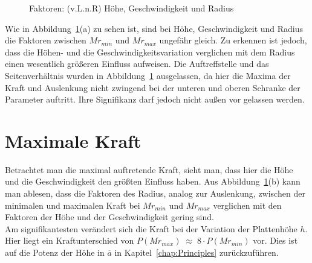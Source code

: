 \begin{figure}[H]%
	\centering
	\qquad
	\caption{Faktoren: (v.L.n.R) Höhe, Geschwindigkeit und Radius}%
	\label{fig:Faktoren}%
\end{figure}

Wie in Abbildung~\ref{fig:Faktoren}(a) zu sehen ist, sind bei Höhe, Geschwindigkeit und Radius die Faktoren zwischen $Mr_{min}$ und $Mr_{max}$ ungefähr gleich. Zu erkennen ist jedoch, dass die Höhen- und die Geschwindigkeitsvariation verglichen mit dem Radius einen wesentlich größeren Einfluss aufweisen.
Die Auftreffstelle und das Seitenverhältnis wurden in Abbildung~\ref{fig:Faktoren} ausgelassen, da hier die Maxima der Kraft und Auslenkung nicht zwingend bei der unteren und oberen Schranke der Parameter auftritt. Ihre Signifikanz darf jedoch nicht außen vor gelassen werden.\\


\section{Maximale Kraft}
\label{sec:Kraft}

Betrachtet man die maximal auftretende Kraft, sieht man, dass hier die Höhe und die Geschwindigkeit den größten Einfluss haben. Aus Abbildung~\ref{fig:Faktoren}(b) kann man ablesen, dass die Faktoren des Radius, analog zur Auslenkung, zwischen der minimalen und maximalen Kraft bei $Mr_{min}$ und $Mr_{max}$ verglichen mit den Faktoren der Höhe und der Geschwindigkeit gering sind. \\
Am signifikantesten verändert sich die Kraft bei der Variation der Plattenhöhe $h$. Hier liegt ein Kraftunterschied von $P(Mr_{max}) \; \approx \; 8 \cdot P(Mr_{min})$ vor. Dies ist auf die Potenz der Höhe in $\overline{a}$ in Kapitel~\ref{chap:Principles} zurückzuführen. \\


